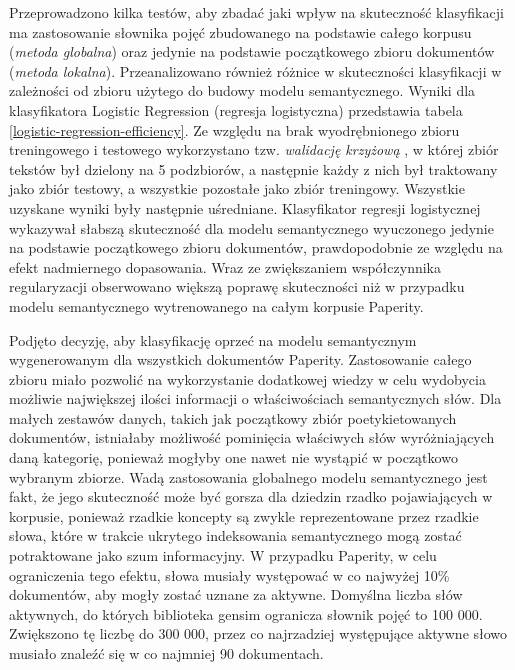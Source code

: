 \documentclass{pracamgr}
\begin{document}
Przeprowadzono kilka testów, aby zbadać jaki wpływ na skuteczność klasyfikacji ma zastosowanie słownika pojęć zbudowanego na podstawie całego korpusu (\textit{metoda globalna}) oraz jedynie na podstawie początkowego zbioru dokumentów (\textit{metoda lokalna}). Przeanalizowano również różnice w skuteczności klasyfikacji w zależności od zbioru użytego do budowy modelu semantycznego. Wyniki dla klasyfikatora Logistic Regression (regresja logistyczna) przedstawia tabela \ref{logistic-regression-efficiency}. Ze względu na brak wyodrębnionego zbioru treningowego i testowego wykorzystano tzw. \textit{walidację krzyżową} \cite{grossman}, w której zbiór tekstów był dzielony na 5 podzbiorów, a następnie każdy z nich był traktowany jako zbiór testowy, a wszystkie pozostałe jako zbiór treningowy. Wszystkie uzyskane wyniki były następnie uśredniane. Klasyfikator regresji logistycznej wykazywał słabszą skuteczność dla modelu semantycznego wyuczonego jedynie na podstawie początkowego zbioru dokumentów, prawdopodobnie ze względu na efekt nadmiernego dopasowania. Wraz ze zwiększaniem współczynnika regularyzacji obserwowano większą poprawę skuteczności niż w przypadku modelu semantycznego wytrenowanego na całym korpusie Paperity.

Podjęto decyzję, aby klasyfikację oprzeć na modelu semantycznym wygenerowanym dla wszystkich dokumentów Paperity. Zastosowanie całego zbioru miało pozwolić na wykorzystanie dodatkowej wiedzy w celu wydobycia możliwie największej ilości informacji o właściwościach semantycznych słów. Dla małych zestawów danych, takich jak początkowy zbiór poetykietowanych dokumentów, istniałaby możliwość pominięcia właściwych słów wyróżniających daną kategorię, ponieważ mogłyby one nawet nie wystąpić w początkowo wybranym zbiorze. Wadą zastosowania globalnego modelu semantycznego jest fakt, że jego skuteczność może być gorsza dla dziedzin rzadko pojawiających w korpusie, ponieważ rzadkie koncepty są zwykle reprezentowane przez rzadkie słowa, które w trakcie ukrytego indeksowania semantycznego mogą zostać potraktowane jako szum informacyjny. W przypadku Paperity, w celu ograniczenia tego efektu, słowa musiały występować w co najwyżej 10\% dokumentów, aby mogły zostać uznane za aktywne. Domyślna liczba słów aktywnych, do których biblioteka gensim ogranicza słownik pojęć to 100 000. Zwiększono tę liczbę do 300 000, przez co najrzadziej występujące aktywne słowo musiało znaleźć się w co najmniej 90 dokumentach.
\end{document}
